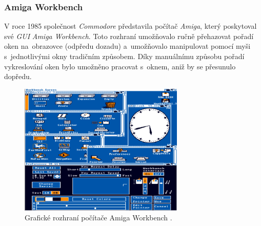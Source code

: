 \documentclass[11pt,twoside,a4paper]{book}
\begin{document}
\subsubsection{Amiga Workbench}
V roce 1985 společnost \textit{Commodore} představila počítač \textit{Amiga}, který poskytoval své \textit{GUI} \textit{Amiga Workbench}. Toto rozhraní umožňovalo ručně přehazovat pořadí oken na~obrazovce (odpředu dozadu) a~umožňovalo manipulovat pomocí myši s~jednotlivými okny tradičním způsobem. Díky manuálnímu způsobu pořadí vykreslování oken bylo umožněno pracovat s~oknem, aniž by se přesunulo dopředu.
\begin{figure}[!ht]
\begin{center}
  \includegraphics[width=0.7\textwidth]{figures/amiga}
\caption{{\label{fig:amigaGUI}}Grafické rozhraní počítače Amiga Workbench \cite{bib:amigaImage}.}
\end{center}
\end{figure}
\end{document}
